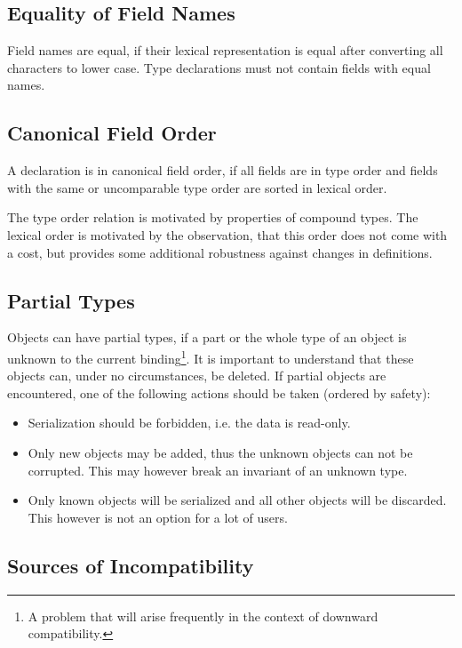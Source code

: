 \documentclass[a4paper,10pt]{article}
\begin{document}
\subsection{Equality of Field Names}

Field names are equal, if their lexical representation is equal after converting all characters to lower case. Type declarations must not contain fields with equal names.

\subsection{Canonical Field Order}

A declaration is in canonical field order, if all fields are in type order and fields with the same or uncomparable type order are sorted in lexical order.

The type order relation is motivated by properties of compound types. The lexical order is motivated by the observation, that this order does not come with a cost, but provides some additional robustness against changes in definitions.


\subsection{Partial Types}

Objects can have partial types, if a part or the whole type of an object is unknown to the current binding\footnote{A problem that will arise frequently in the context of downward compatibility.}. It is important to understand that these objects can, under no circumstances, be deleted. If partial objects are encountered, one of the following actions should be taken (ordered by safety):
\begin{itemize}
 \item Serialization should be forbidden, i.e. the data is read-only.
 \item Only new objects may be added, thus the unknown objects can not be corrupted. This may however break an invariant of an unknown type.
 \item Only known objects will be serialized and all other objects will be discarded. This however is not an option for a lot of users.
\end{itemize}


\subsection{Sources of Incompatibility}
\end{document}
